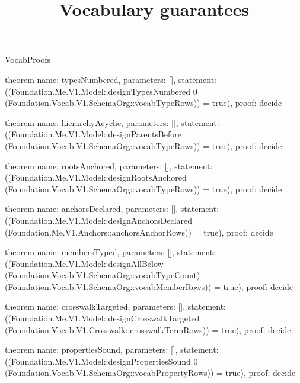 \begin{lexlean}{VocabProofs}
\title{Vocabulary guarantees}
\begin{semanticmodule}
theorem{
  name: typesNumbered,
  parameters: [],
  statement: ((Foundation.Me.V1.Model::designTypesNumbered 0 (Foundation.Vocab.V1.SchemaOrg::vocabTypeRows)) = true),
  proof: decide{}
}

theorem{
  name: hierarchyAcyclic,
  parameters: [],
  statement: ((Foundation.Me.V1.Model::designParentsBefore (Foundation.Vocab.V1.SchemaOrg::vocabTypeRows)) = true),
  proof: decide{}
}

theorem{
  name: rootsAnchored,
  parameters: [],
  statement: ((Foundation.Me.V1.Model::designRootsAnchored (Foundation.Vocab.V1.SchemaOrg::vocabTypeRows)) = true),
  proof: decide{}
}

theorem{
  name: anchorsDeclared,
  parameters: [],
  statement: ((Foundation.Me.V1.Model::designAnchorsDeclared (Foundation.Me.V1.Anchors::anchorsAnchorRows)) = true),
  proof: decide{}
}

theorem{
  name: membersTyped,
  parameters: [],
  statement: ((Foundation.Me.V1.Model::designAllBelow (Foundation.Vocab.V1.SchemaOrg::vocabTypeCount) (Foundation.Vocab.V1.SchemaOrg::vocabMemberRows)) = true),
  proof: decide{}
}

theorem{
  name: crosswalkTargeted,
  parameters: [],
  statement: ((Foundation.Me.V1.Model::designCrosswalkTargeted (Foundation.Vocab.V1.Crosswalk::crosswalkTermRows)) = true),
  proof: decide{}
}

theorem{
  name: propertiesSound,
  parameters: [],
  statement: ((Foundation.Me.V1.Model::designPropertiesSound 0 (Foundation.Vocab.V1.SchemaOrg::vocabPropertyRows)) = true),
  proof: decide{}
}
\end{semanticmodule}
\end{lexlean}
